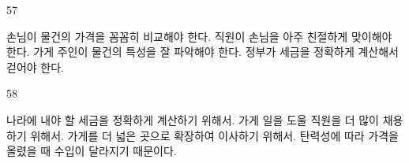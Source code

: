 \documentclass[fs9,seriesFre]{korfarm-base}
\begin{document}
\begin{kfSentenceUnit}{57}{}
\begin{kfChoices}
\kfChoice 손님이 물건의 가격을 꼼꼼히 비교해야 한다.
\kfChoice 직원이 손님을 아주 친절하게 맞이해야 한다.
\kfChoice 가게 주인이 물건의 특성을 잘 파악해야 한다.
\kfChoice 정부가 세금을 정확하게 계산해서 걷어야 한다.
\end{kfChoices}
\end{kfSentenceUnit}

\begin{kfSentenceUnit}{58}{}
\begin{kfChoices}
\kfChoice 나라에 내야 할 세금을 정확하게 계산하기 위해서.
\kfChoice 가게 일을 도울 직원을 더 많이 채용하기 위해서.
\kfChoice 가게를 더 넓은 곳으로 확장하여 이사하기 위해서.
\kfChoice 탄력성에 따라 가격을 올렸을 때 수입이 달라지기 때문이다.
\end{kfChoices}
\end{kfSentenceUnit}

\kfEndMC

\end{document}
